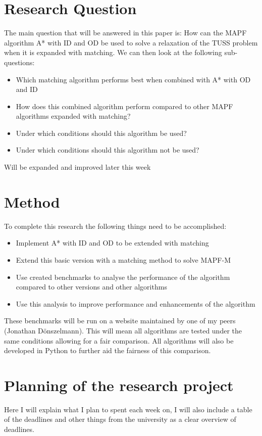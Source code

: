 \documentclass[english]{article}
\begin{document}
\section{Research Question}
The main question that will be answered in this paper is: How can the MAPF algorithm A* with ID and OD be used to solve a relaxation of the TUSS problem when it is expanded with matching. We can then look at the following sub-questions:
\begin{itemize}
	\item Which matching algorithm performs best when combined with A* with OD and ID
	\item How does this combined algorithm perform compared to other MAPF algorithms expanded with matching?
	\item Under which conditions should this algorithm be used?
	\item Under which conditions should this algorithm not be used?
\end{itemize}
{\color{red}Will be expanded and improved later this week}

\section{Method}
To complete this research the following things need to be accomplished:
\begin{itemize}
	\item Implement A* with ID and OD to be extended with matching
	\item Extend this basic version with a matching method to solve MAPF-M
	\item Use created benchmarks to analyse the performance of the algorithm compared to other versions and other algorithms
	\item Use this analysis to improve performance and enhancements of the algorithm
\end{itemize}

These benchmarks will be run on a website maintained by one of my peers (Jonathan D\"onszelmann). This will mean all algorithms are tested under the same conditions allowing for a fair comparison. All algorithms will also be developed in Python to further aid the fairness of this comparison.

\section{Planning of the research project}
Here I will explain what I plan to spent each week on, I will also include a table of the deadlines and other things from the university as a clear overview of deadlines.
\end{document}
